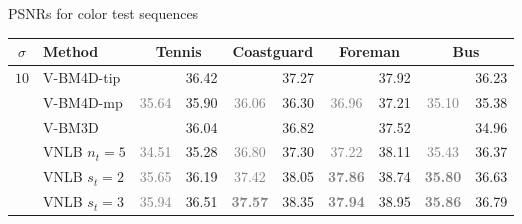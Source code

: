\documentclass[mathserif, 8pt]{beamer}
\newcommand{\best}[1]{#1}
\newcommand{\bsic}[1]{\textcolor{gray}{#1}}
\newcommand{\Bsic}[1]{\textcolor{gray}{\textbf{#1}}}
\begin{document}
\begin{frame}{PSNRs for color test sequences}
	\begin{center}
		{\small
		\renewcommand{\tabcolsep}{2mm}
		\renewcommand{\arraystretch}{1.0}
		\begin{tabular}{ c | l |c c | c c | c c | c c}
			\hline
			\rule{0pt}{6pt}$\sigma$ & Method             & \multicolumn{2}{c}{Tennis}  & \multicolumn{2}{c}{Coastguard}&\multicolumn{2}{c}{Foreman}& \multicolumn{2}{c}{Bus}    \\\hline
			\multirow{5}{*}{$10$} & V-BM4D-tip           & \bsic{     } & \best{36.42} & \bsic{     } & \best{37.27} & \bsic{     } &       37.92  & \bsic{     } &       36.23  \\
			                      & V-BM4D-mp            & \bsic{35.64} &       35.90  & \bsic{36.06} &       36.30  & \bsic{36.96} &       37.21  & \bsic{35.10} &       35.38  \\
			                      & V-BM3D               & \bsic{     } &       36.04  & \bsic{     } &       36.82  & \bsic{     } &       37.52  & \bsic{     } &       34.96  \\
			                      & VNLB $n_t = 5$       & \bsic{34.51} &       35.28  & \bsic{36.80} & \best{37.30} & \bsic{37.22} & \best{38.11} & \bsic{35.43} & \best{36.37} \\
			                      & VNLB   $s_t = 2$     & \bsic{35.65} &       36.19  & \bsic{37.42} &       38.05  & \Bsic{37.86} &       38.74  & \Bsic{35.80} &       36.63  \\
			                      & VNLB   $s_t = 3$     & \bsic{35.94} &       36.51  & \Bsic{37.57} &       38.35  & \Bsic{37.94} &       38.95  & \Bsic{35.86} &       36.79  \\

\end{tabular}}
\end{center}
\end{frame}
\end{document}
